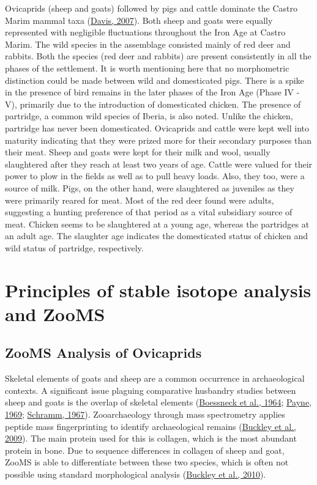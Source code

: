 \documentclass[preprint, 3p, authoryear]{elsarticle} %
\begin{document}
Ovicaprids (sheep and goats) followed by pigs and cattle dominate the Castro Marim mammal taxa (\protect\hyperlink{ref-davis07}{Davis, 2007}). Both sheep and goats were equally represented with negligible fluctuations throughout the Iron Age at Castro Marim. The wild species in the assemblage consisted mainly of red deer and rabbits. Both the species (red deer and rabbits) are present consistently in all the phases of the settlement. It is worth mentioning here that no morphometric distinction could be made between wild and domesticated pigs. There is a spike in the presence of bird remains in the later phases of the Iron Age (Phase IV - V), primarily due to the introduction of domesticated chicken. The presence of partridge, a common wild species of Iberia, is also noted. Unlike the chicken, partridge has never been domesticated. Ovicaprids and cattle were kept well into maturity indicating that they were prized more for their secondary purposes than their meat. Sheep and goats were kept for their milk and wool, usually slaughtered after they reach at least two years of age. Cattle were valued for their power to plow in the fields as well as to pull heavy loads. Also, they too, were a source of milk. Pigs, on the other hand, were slaughtered as juveniles as they were primarily reared for meat. Most of the red deer found were adults, suggesting a hunting preference of that period as a vital subsidiary source of meat. Chicken seems to be slaughtered at a young age, whereas the partridges at an adult age. The slaughter age indicates the domesticated status of chicken and wild status of partridge, respectively.

\hypertarget{principles-of-stable-isotope-analysis-and-zooms}{%
\section{Principles of stable isotope analysis and ZooMS}\label{principles-of-stable-isotope-analysis-and-zooms}}

\hypertarget{zooms-analysis-of-ovicaprids}{%
\subsection{ZooMS Analysis of Ovicaprids}\label{zooms-analysis-of-ovicaprids}}

Skeletal elements of goats and sheep are a common occurrence in archaeological contexts. A significant issue plaguing comparative husbandry studies between sheep and goats is the overlap of skeletal elements (\protect\hyperlink{ref-boessneck_etal64}{Boessneck et al., 1964}; \protect\hyperlink{ref-payne69}{Payne, 1969}; \protect\hyperlink{ref-schramm67}{Schramm, 1967}). Zooarchaeology through mass spectrometry applies peptide mass fingerprinting to identify archaeological remains (\protect\hyperlink{ref-buckley_etal09}{Buckley et al., 2009}). The main protein used for this is collagen, which is the most abundant protein in bone. Due to sequence differences in collagen of sheep and goat, ZooMS is able to differentiate between these two species, which is often not possible using standard morphological analysis (\protect\hyperlink{ref-buckley_etal10}{Buckley et al., 2010}).
\end{document}
